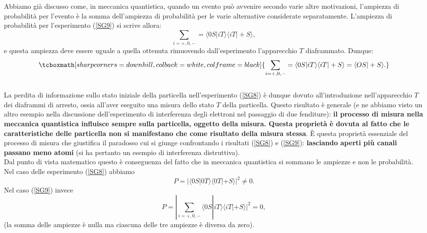 Abbiamo già discusso come, in meccanica quantistica, quando un evento può avvenire secondo varie altre motivazioni, l'ampiezza di probabilità per l'evento è la somma dell'ampiezza di probabilità per le varie alternative considerate separatamente. L'ampiezza di probabilità per l'esperimento (\ref{SG9}) si scrive allora:
	\begin{equation}
		\sum\limits_{i=+,0,-}=\langle 0S | iT \rangle \langle iT | +S \rangle ,
	\end{equation}
e questa ampiezza deve essere uguale a quella ottenuta rimuovendo  dall'esperimento l'apparecchio $T$ diaframmato. Dunque:
	\begin{equation}
		\tcboxmath[sharp corners=downhill, colback=white, colframe=black]{
			\sum\limits_{i=+,0,-}=\langle 0S | iT \rangle \langle iT | +S \rangle = \langle OS | +S \rangle .
			}
 	\label{cap3_2}
	\end{equation}\\

La perdita di informazione sullo stato iniziale della particella nell'esperimento (\ref{SG8}) è dunque dovuto all'introduzione nell'apparecchio $T$ dei diaframmi di arresto, ossia all'aver eseguito una misura dello stato $T$ della particella. Questo risultato è generale (e ne abbiamo visto un altro esempio nella discussione dell'esperimento di interferenza degli elettroni nel passaggio di due fenditure): \textbf{il processo di misura nella meccanica quantistica influisce sempre sulla particella, oggetto della misura. Questa proprietà è dovuta al fatto che le caratteristiche delle particella non si manifestano che come risultato della misura stessa}. È questa proprietà essenziale del processo di misura che giustifica il paradosso cui si giunge confrontando i risultati (\ref{SG8}) e (\ref{SG9}): \textbf{lasciando aperti più canali passano meno atomi} (si ha pertanto un esempio di interferenza distruttiva).\\

Dal punto di vista matematico questo è conseguenza del fatto che in meccanica quantistica si sommano le ampiezze e non le probabilità. Nel caso delle esperimento (\ref{SG8}) abbiamo
	\begin{equation}
		P= | \langle 0S | 0T \rangle \langle 0T | +S \rangle  |^2 \neq 0 .
	\end{equation}
Nel caso (\ref{SG9}) invece
	\begin{equation}
		P= |\sum \limits_{i=+,0,-}\langle 0S | iT \rangle \langle iT | +S \rangle |^2 =0 ,
	\end{equation}
(la somma delle ampiezze è nulla ma ciascuna delle tre ampiezze è diversa da zero).\\

